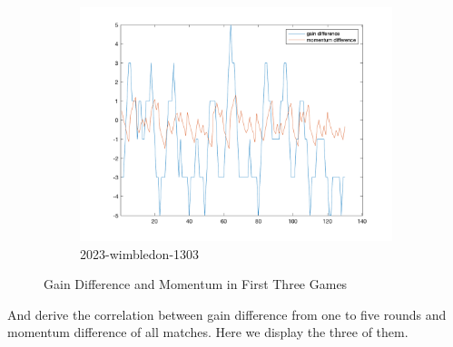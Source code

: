 \begin{figure}[htbp]
\begin{subfigure}[b]{0.34\textwidth}
        \includegraphics[width=\linewidth]{mainmatter/photos/diff_match3.png}
        \caption{2023-wimbledon-1303}
    \end{subfigure}
    \caption{Gain Difference and Momentum in First Three Games}
    \label{fig:Gain Difference and Momentum}
\end{figure}

And derive the correlation between gain difference from one to five rounds 
and momentum difference of all matches. Here we display the three of them.

